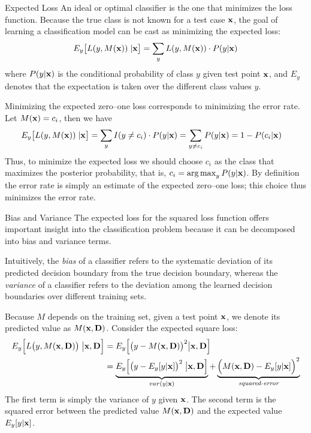 \begin{frame}{Expected Loss}
An ideal or optimal
classif\/{i}er is the one that minimizes the loss function. Because
the true class is not known for a test case $\mathbf{x}$, the goal of
learning a classif\/{i}cation model can be cast as minimizing the
expected loss:
\begin{align*}
  E_y\bigl[L(y, M(\mathbf{x})) \;| \mathbf{x}\bigr] =
  \sum_{y} L(y, M(\mathbf{x})) \cdot P(y|\mathbf{x})
\end{align*}
where $P(y|\mathbf{x})$ is the conditional probability of class $y$ given
test point $\mathbf{x}$, and $E_y$ denotes
that the expectation is taken over the different
class values $y$.

\medskip
Minimizing the expected zero--one loss corresponds to minimizing
the error rate.
Let $M(\mathbf{x}) =
c_i$, then we have
\begin{align*}
  E_y\bigl[L(y, M(\mathbf{x})) \;| \mathbf{x}\bigr] &
  = \sum_{y} I(y \ne c_i) \cdot P(y|\mathbf{x})
   = \sum_{y \ne c_i} P(y|\mathbf{x})
   = 1 - P(c_i | \mathbf{x})
\end{align*}
Thus, to minimize the expected loss we should choose $c_i$ as the
class that maximizes the posterior probability, that is, $c_i =
\mathop{\arg\max}_{y} P(y|\mathbf{x})$. By def\/{i}nition
the error rate is simply an
estimate of the expected zero--one loss; this choice thus
minimizes the error rate.
\end{frame}


\begin{frame}{Bias and Variance}
  \small
The expected loss for the squared loss function offers important
insight into the classif\/{i}cation problem because it can be
decomposed into bias and variance terms. 

\medskip
Intuitively, the {\em
bias} of a classif\/{i}er refers to the
systematic deviation of its predicted decision boundary from the
true decision boundary, whereas the {\em variance}
 of a classif\/{i}er refers to the
deviation among the learned decision boundaries over different
training sets. 

\medskip
Because
 $M$ depends on the training set, given a test point $\mathbf{x}$,
 we denote its predicted value as
 $M(\mathbf{x}, \mathbf{D})$. Consider the expected square loss:
\begin{align*}
E_y\Bigl[ L\bigl(y,M(\mathbf{x}, \mathbf{D})\bigr) \;\bigl| \mathbf{x}, \mathbf{D} \Bigr] 
  & = E_y\Bigl[ \bigl(y - M(\mathbf{x}, \mathbf{D})\bigr)^2 \bigl| \mathbf{x},
  \mathbf{D}\Bigr]\\ 
  & =  \underbrace{E_y\Bigl[ \bigl(y - E_y[y|\mathbf{x}]\bigr)^2 \;
      \bigl| \mathbf{x}, \mathbf{D}\Bigr]}_{var(y|\mathbf{x})} +
    \underbrace{\Bigl(M(\mathbf{x}, \mathbf{D}) -
    E_y[y|\mathbf{x}]\Bigr)^2}_{\textit{squared-error}}
\end{align*}
The f\/{i}rst term is simply the variance of $y$ given $\mathbf{x}$.
The second term
 is the squared error between the
predicted value $M(\mathbf{x}, \mathbf{D})$ and the expected value $E_y[y|\mathbf{x}]$.
\end{frame}

